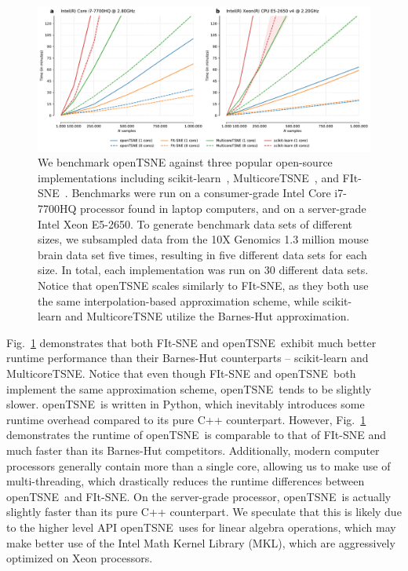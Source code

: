 \documentclass[twocolumn]{bmcart}
\newcommand{\opentsne}{\textsf{openTSNE}}
\begin{document}
\begin{figure}[htbp]
  \includegraphics[width=\textwidth]{benchmarks}
  \caption{\label{fig:benchmarks}We benchmark openTSNE against three popular open-source implementations including scikit-learn~\cite{pedregosa2011scikit}, MulticoreTSNE~\cite{Ulyanov2016}, and FIt-SNE~\cite{linderman2019fast}. Benchmarks were run on a consumer-grade Intel Core i7-7700HQ processor found in laptop computers, and on a server-grade Intel Xeon E5-2650. To generate benchmark data sets of different sizes, we subsampled data from the 10X Genomics 1.3 million mouse brain data set five times, resulting in five different data sets for each size. In total, each implementation was run on 30 different data sets. Notice that openTSNE scales similarly to FIt-SNE, as they both use the same interpolation-based approximation scheme, while scikit-learn and MulticoreTSNE utilize the Barnes-Hut approximation.}
\end{figure}

Fig.~\ref{fig:benchmarks} demonstrates that both \textsf{FIt-SNE} and \opentsne\ exhibit much better runtime performance than their Barnes-Hut counterparts -- \textsf{scikit-learn} and \textsf{MulticoreTSNE}. Notice that even though \textsf{FIt-SNE} and \opentsne\ both implement the same approximation scheme, \opentsne\ tends to be slightly slower. \opentsne\ is written in Python, which inevitably introduces some runtime overhead compared to its pure C++ counterpart. However, Fig.~\ref{fig:benchmarks} demonstrates the runtime of \opentsne\ is comparable to that of \textsf{FIt-SNE} and much faster than its Barnes-Hut competitors. Additionally, modern computer processors generally contain more than a single core, allowing us to make use of multi-threading, which drastically reduces the runtime differences between \opentsne\ and \textsf{FIt-SNE}. On the server-grade processor, \opentsne\ is actually slightly faster than its pure C++ counterpart. We speculate that this is likely due to the higher level API \opentsne\ uses for linear algebra operations, which may make better use of the Intel Math Kernel Library (MKL), which are aggressively optimized on Xeon processors.
\end{document}

